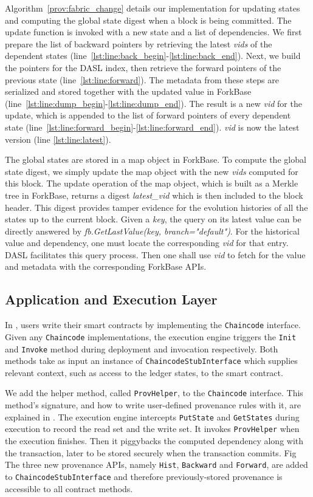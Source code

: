 Algorithm~\ref{prov:fabric_change} details our implementation for updating states
and computing the global state digest when a block is being
committed. The update function is invoked with a new state
and a list of dependencies. We first prepare the list of backward pointers by retrieving the latest {\em vids} of the dependent
states (line~\ref{lst:line:back_begin}-\ref{lst:line:back_end}). Next, we build the pointers for the DASL
index, then retrieve the forward pointers
of the previous state (line~\ref{lst:line:forward}). The metadata from these steps are serialized and stored together with the updated
value in ForkBase (line~\ref{lst:line:dump_begin}-\ref{lst:line:dump_end}). The result is a new {\em vid} for
the update, which is appended to the list of forward pointers of every dependent state
(line~\ref{lst:line:forward_begin}-\ref{lst:line:forward_end}). {\em vid} is now 
the latest version (line \ref{lst:line:latest}). 

The global states are stored in a map object in ForkBase. To compute the global state digest, we simply update
the map object with the new {\em vids} computed for this block. The update operation of the map object, which
is built as a Merkle tree in ForkBase, returns a digest {\em latest\_vid} which is then included
to the block header.  This digest provides tamper evidence for the evolution histories of all the states up to
the current block.
Given a {\em key}, the query on its latest value can be directly answered by \textit{fb.GetLastValue(key, branch="default")}. For the historical value and dependency, one must locate the corresponding {\em vid} for that entry. 
DASL facilitates this query process. 
Then one shall use {\em vid} to fetch for the value and metadata with the corresponding ForkBase APIs. 

\subsection{Application and Execution Layer}
In {\fs}, users write their smart contracts by implementing the \texttt{Chaincode} interface. Given any  \texttt{Chaincode} implementations, the execution engine triggers the \texttt{Init} and \texttt{Invoke} method during deployment and
invocation respectively. Both methods take as input an instance of \texttt{ChaincodeStubInterface} which
supplies relevant context, such as access to the ledger states, to the smart contract. 

We add the helper method, called \texttt{ProvHelper}, to the \texttt{Chaincode} interface. This method's signature,
and how to write user-defined provenance rules with it, are explained in . The
execution engine intercepts \texttt{PutState} and \texttt{GetStates} during execution to record the read set and the
write set. It invokes \texttt{ProvHelper} when the execution finishes. Then it piggybacks the computed dependency along with the transaction, later to be stored securely when the transaction commits. Fig
The three new provenance APIs, namely \texttt{Hist}, \texttt{Backward} and \texttt{Forward}, are added to \texttt{ChaincodeStubInterface}
and therefore previously-stored provenance is accessible to all contract methods. 



